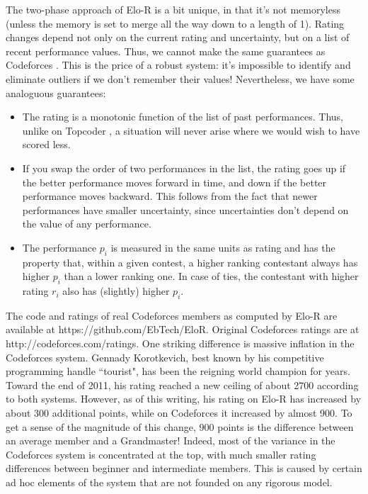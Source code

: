 \documentclass{article}
\begin{document}
The two-phase approach of Elo-R is a bit unique, in that it's not memoryless (unless the memory is set to merge all the way down to a length of 1). Rating changes depend not only on the current rating and uncertainty, but on a list of recent performance values. Thus, we cannot make the same guarantees as Codeforces \cite{Codeforces}. This is the price of a robust system: it's impossible to identify and eliminate outliers if we don't remember their values! Nevertheless, we have some analoguous guarantees:
\begin{itemize}
\item The rating is a monotonic function of the list of past performances. Thus, unlike on Topcoder \cite{forivsektheoretical}, a situation will never arise where we would wish to have scored less.
\item If you swap the order of two performances in the list, the rating goes up if the better performance moves forward in time, and down if the better performance moves backward. This follows from the fact that newer performances have smaller uncertainty, since uncertainties don't depend on the value of any performance.
\item The performance $p_i$ is measured in the same units as rating and has the property that, within a given contest, a higher ranking contestant always has higher $p_i$ than a lower ranking one. In case of ties, the contestant with higher rating $r_i$ also has (slightly) higher $p_i$.
\end{itemize}

The code and ratings of real Codeforces members as computed by Elo-R are available at https://github.com/EbTech/EloR. Original Codeforces ratings are at http://codeforces.com/ratings. One striking difference is massive inflation in the Codeforces system. Gennady Korotkevich, best known by his competitive programming handle ``tourist", has been the reigning world champion for years. Toward the end of 2011, his rating reached a new ceiling of about 2700 according to both systems. However, as of this writing, his rating on Elo-R has increased by about 300 additional points, while on Codeforces it increased by almost 900. To get a sense of the magnitude of this change, 900 points is the difference between an average member and a Grandmaster! Indeed, most of the variance in the Codeforces system is concentrated at the top, with much smaller rating differences between beginner and intermediate members. This is caused by certain ad hoc elements of the system that are not founded on any rigorous model.
\end{document}

